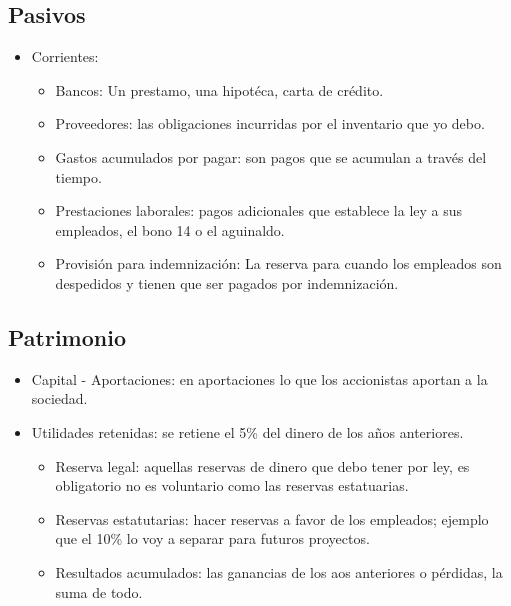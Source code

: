 \subsection{Pasivos}
\begin{itemize}
    \item Corrientes:
        \begin{itemize}
            \item Bancos: Un prestamo, una hipotéca, carta de crédito.
            \item Proveedores: las obligaciones incurridas por el inventario que yo debo.
            \item Gastos acumulados por pagar: son pagos que se acumulan a través del tiempo.
            \item Prestaciones laborales: pagos adicionales que establece la ley a sus empleados, el bono 14 o el aguinaldo.
            \item Provisión para indemnización: La reserva para cuando los empleados son despedidos y tienen que ser pagados por indemnización.
        \end{itemize}
\end{itemize}


\subsection{Patrimonio}
\begin{itemize}
    \item Capital - Aportaciones: en aportaciones lo que los accionistas aportan a la sociedad.
    \item Utilidades retenidas: se retiene el 5\% del dinero de los años anteriores.
        \begin{itemize}
            \item Reserva legal: aquellas reservas de dinero que debo tener por ley, es obligatorio no es voluntario como las reservas estatuarias.
            \item Reservas estatutarias: hacer reservas a favor de los empleados; ejemplo que el 10\% lo voy a separar para futuros proyectos.
            \item Resultados acumulados: las ganancias de los aos anteriores o pérdidas, la suma de todo.  
        \end{itemize}
\end{itemize}

